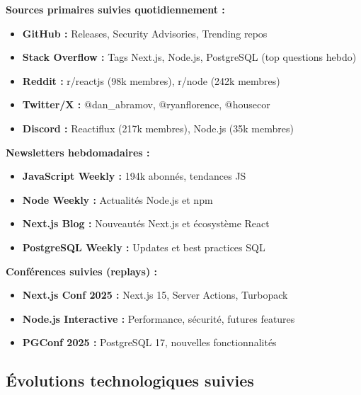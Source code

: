 \begin{tcolorbox}[colback=blue!5!white,colframe=blue!60!black,title=\textbf{Écosystème de veille technologique}]
\textbf{Sources primaires suivies quotidiennement :}
\begin{itemize}
    \item \textbf{GitHub :} Releases, Security Advisories, Trending repos
    \item \textbf{Stack Overflow :} Tags Next.js, Node.js, PostgreSQL (top questions hebdo)
    \item \textbf{Reddit :} r/reactjs (98k membres), r/node (242k membres)
    \item \textbf{Twitter/X :} @dan\_abramov, @ryanflorence, @housecor
    \item \textbf{Discord :} Reactiflux (217k membres), Node.js (35k membres)
\end{itemize}

\textbf{Newsletters hebdomadaires :}
\begin{itemize}
    \item \textbf{JavaScript Weekly :} 194k abonnés, tendances JS
    \item \textbf{Node Weekly :} Actualités Node.js et npm
    \item \textbf{Next.js Blog :} Nouveautés Next.js et écosystème React
    \item \textbf{PostgreSQL Weekly :} Updates et best practices SQL
\end{itemize}

\textbf{Conférences suivies (replays) :}
\begin{itemize}
    \item \textbf{Next.js Conf 2025 :} Next.js 15, Server Actions, Turbopack
    \item \textbf{Node.js Interactive :} Performance, sécurité, futures features
    \item \textbf{PGConf 2025 :} PostgreSQL 17, nouvelles fonctionnalités
\end{itemize}
\end{tcolorbox}

\subsection{Évolutions technologiques suivies}

